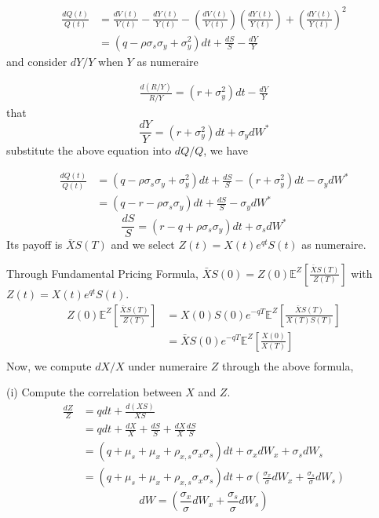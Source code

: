 \documentclass[a4]{article}
\begin{document}
$$
\begin{aligned}
\frac{dQ(t)}{Q(t)}&=\frac{dV(t)}{V(t)}-\frac{dY(t)}{Y(t)}-(\frac{dV(t)}{V(t)})(\frac{dY(t)}{Y(t)})+(\frac{dY(t)}{Y(t)})^{2}\\
&=(q-\rho \sigma_{s}\sigma_{y}+\sigma_{y}^{2})dt + \frac{dS}{S} - \frac{dY}{Y}
\end{aligned}
$$
and consider $dY/Y$ when $Y$ as numeraire\par 
$$
\begin{aligned}
\frac{d(R/Y)}{R/Y} = (r+\sigma_{y}^{2})dt  - \frac{dY}{Y}
\end{aligned}$$
that
$$
\frac{dY}{Y}= (r+\sigma_{y}^{2})dt + \sigma_{y}dW^{*}
$$
substitute the above equation into $dQ/Q$, we have\par 
$$
\begin{aligned}
\frac{dQ(t)}{Q(t)}&=(q-\rho \sigma_{s}\sigma_{y}+\sigma_{y}^{2})dt + \frac{dS}{S} - (r+\sigma_{y}^{2})dt - \sigma_{y}dW^{*}\\
&=(q-r-\rho \sigma_{s}\sigma_{y})dt + \frac{dS}{S}-\sigma_{y}dW^{*}
\end{aligned}
$$
$$
\frac{dS}{S}=(r-q+\rho \sigma_{s}\sigma_{y})dt +\sigma_{s}dW^{*}
$$
Its payoff is $\bar{X}S(T)$ and we select $Z(t)=X(t)e^{qt}S(t)$ as numeraire.\par 
Through Fundamental Pricing Formula, $\bar{X}S(0)=Z(0)\mathbb{E}^{Z}\left[\frac{\bar{X}S(T)}{Z(T)}\right]$ with $Z(t)=X(t)e^{qt}S(t)$.
$$
\begin{aligned}
Z(0)\mathbb{E}^{Z}\left[\frac{\bar{X}S(T)}{Z(T)}\right]&=X(0)S(0)e^{-qT}\mathbb{E}^{Z}\left[\frac{\bar{X}S(T)}{X(T)S(T)}\right]\\
&=\bar{X}S(0)e^{-qT}\mathbb{E}^{Z}\left[\frac{X(0)}{X(T)}\right]\\
\end{aligned}
$$  
Now, we compute $dX/X$ under numeraire $Z$ through the above formula,\par 
(i) Compute the correlation between $X$ and $Z$.
$$
\begin{aligned}
\frac{dZ}{Z} &= qdt + \frac{d(XS)}{XS}\\
&=qdt + \frac{dX}{X} + \frac{dS}{S}+\frac{dX}{X}\frac{dS}{S}\\
&=(q + \mu_{s}+\mu_{x}+\rho_{x,s}\sigma_{x}\sigma_{s})dt + \sigma_{x}dW_{x}+\sigma_{s}dW_{s}\\
&=(q + \mu_{s}+\mu_{x}+\rho_{x,s}\sigma_{x}\sigma_{s})dt + \sigma (\frac{\sigma_{x}}{\sigma}dW_{x}+\frac{\sigma_{s}}{\sigma}dW_{s})
\end{aligned}
$$
$$
dW = (\frac{\sigma_{x}}{\sigma}dW_{x}+\frac{\sigma_{s}}{\sigma}dW_{s})
$$
\end{document}
